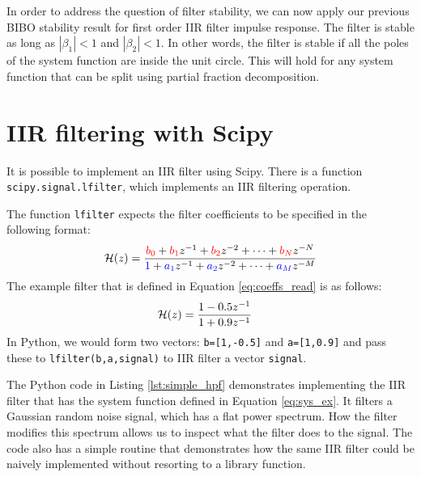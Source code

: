 In order to address the question of filter stability, we can now apply
our previous BIBO stability result for first order IIR filter impulse
response. The filter is stable as long as $|\beta_1|<1$ and
$|\beta_2|<1$. In other words, the filter is stable if all the
poles of the system function are inside the unit circle. This will hold for
any system function that can be split using partial fraction decomposition.

\section{IIR filtering with Scipy}

It is possible to implement an IIR filter using Scipy. There is a
function \verb|scipy.signal.lfilter|, which implements an IIR
filtering operation.

The function \verb|lfilter| expects the filter coefficients to be specified in the following format:
\begin{equation}
    \mathcal{H}(z) = \frac{{\color{red}b_0} + {\color{red}b_1} z^{-1} + {\color{red}b_2} z^{-2} + \cdots
    + {\color{red}b_N} z^{-N}}{{\color{blue}1} + {\color{blue}a_1} z^{-1} + {\color{blue}a_2} z^{-2} + \cdots + {\color{blue}a_M} z^{-M}}
\end{equation}
The example filter that is defined in Equation \ref{eq:coeffs_read} is as follows:
\begin{align}
    \mathcal{H}(z) & = \frac{1-0.5z^{-1}}{1+0.9 z^{-1}}
    \label{eq:sys_ex}
\end{align}
In Python, we would form two vectors: {\color{red}\verb|b=[1,-0.5]|}
and {\color{blue}\verb|a=[1,0.9]|} and pass these to \verb|lfilter(b,a,signal)| to
IIR filter a vector \verb|signal|.


The Python code in Listing \ref{lst:simple_hpf} demonstrates
implementing the IIR filter that has the system function defined in
Equation \ref{eq:sys_ex}. It filters a Gaussian random noise signal,
which has a flat power spectrum. How the filter modifies this spectrum
allows us to inspect what the filter does to the signal. The code also
has a simple routine that demonstrates how the same IIR filter could be
naively implemented without resorting to a library function.


